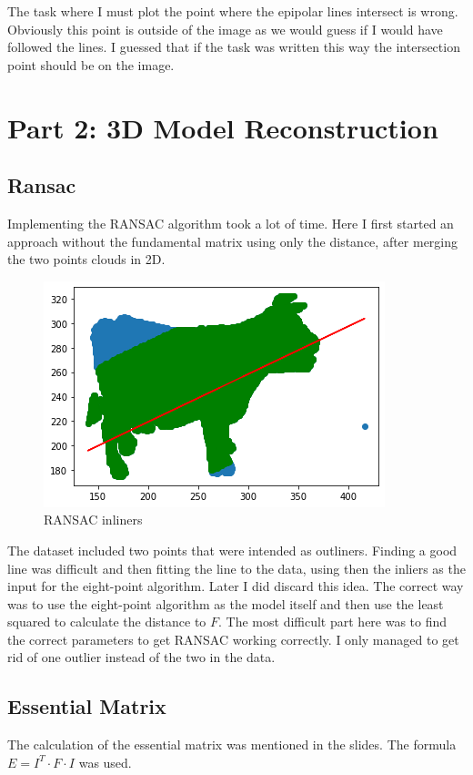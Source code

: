 \documentclass[12pt]{article}
\begin{document}
The task where I must plot the point where the epipolar lines intersect is wrong. Obviously this point is
outside of the image as we would guess if I would have followed the lines. I guessed that if the task was written
this way the intersection point should be on the image.

\section{Part 2: 3D Model Reconstruction}

\subsection{Ransac}

Implementing the RANSAC algorithm took a lot of time. Here I first started an approach without the fundamental
matrix using only the distance, after merging the two points clouds in 2D.

\begin{figure}[h!]
    \centering
    \includegraphics[scale=0.5]{ransac_inliners.png}
    \caption{RANSAC inliners}
\end{figure}

The dataset included two points that were intended as outliners. Finding a good line was difficult and then
fitting the line to the data, using then the inliers as the input for the eight-point algorithm.
Later I did discard this idea. The correct way was to use the eight-point algorithm as the model itself and then
use the least squared to calculate the distance to $F$.
The most difficult part here was to find the correct parameters to get RANSAC working correctly. I only managed 
to get rid of one outlier instead of the two in the data.

\subsection{Essential Matrix}
The calculation of the essential matrix was mentioned in the slides. The formula $E = I^T \cdot F \cdot I$ was
used.
\end{document}
